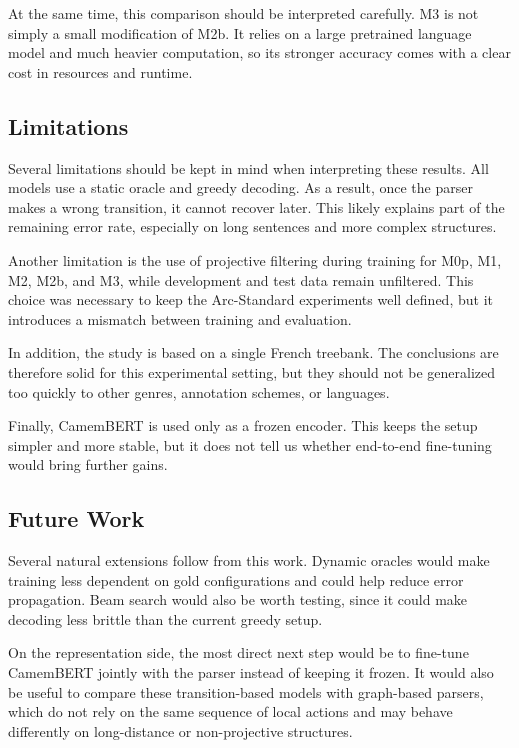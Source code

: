 \documentclass[12pt,letterpaper]{article}
\begin{document}
At the same time, this comparison should be interpreted carefully. M3 is not
simply a small modification of M2b. It relies on a large pretrained language
model and much heavier computation, so its stronger accuracy comes with a
clear cost in resources and runtime.

\subsection{Limitations}
\label{subsec:limitations}

Several limitations should be kept in mind when interpreting these results.
All models use a static oracle and greedy decoding. As a result, once the
parser makes a wrong transition, it cannot recover later. This likely
explains part of the remaining error rate, especially on long sentences and
more complex structures.

Another limitation is the use of projective filtering during training for
M0p, M1, M2, M2b, and M3, while development and test data remain
unfiltered. This choice was necessary to keep the Arc-Standard experiments
well defined, but it introduces a mismatch between training and evaluation.

In addition, the study is based on a single French treebank. The conclusions
are therefore solid for this experimental setting, but they should not be
generalized too quickly to other genres, annotation schemes, or languages.

Finally, CamemBERT is used only as a frozen encoder. This keeps the setup
simpler and more stable, but it does not tell us whether end-to-end
fine-tuning would bring further gains.

\subsection{Future Work}
\label{subsec:future_work}

Several natural extensions follow from this work. Dynamic oracles would make
training less dependent on gold configurations and could help reduce error
propagation. Beam search would also be worth testing, since it could make
decoding less brittle than the current greedy setup.

On the representation side, the most direct next step would be to fine-tune
CamemBERT jointly with the parser instead of keeping it frozen. It would
also be useful to compare these transition-based models with graph-based
parsers, which do not rely on the same sequence of local actions and may
behave differently on long-distance or non-projective structures.
\end{document}
